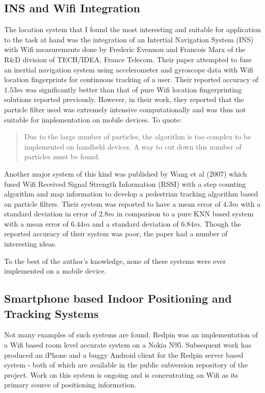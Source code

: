\subsection{INS and Wifi Integration}

The location system that I found the most interesting and suitable for application to the task at hand was the integration of an Intertial Navigation System (INS) with Wifi measurements done by Frederic Evennou and Francois Marx of the R\&D division of TECH/IDEA, France Telecom. Their paper \cite{Evennou} attempted to fuse an inertial navigation system using  accelerometer and gyroscope data with Wifi location fingerprints for continuous tracking of a user. Their reported accuracy of $1.53 m$ was significantly better than that of pure Wifi location fingerprinting solutions reported previously. However, in their work, they reported that the particle filter used was extremely intensive computationally and was thus not suitable for implementation on mobile devices. To quote:

\begin{quote}
Due to the large number of particles, the
algorithm is too complex to be implemented on handheld
devices. A way to cut down this number of particles must be
found.\cite{Evennou}
\end{quote}

Another major system of this kind was published by Wang et al (2007)\cite{Wang} which fused Wifi Received Signal Strength Information (RSSI) with a step counting algorithm and map information to develop a pedestrian tracking algorithm based on particle filters. Their system was reported to have a mean error of $4.3 m$ with a standard deviation in error of $2.8 m$ in comparison to a pure KNN based system with a mean error of $6.44 m$ and a standard deviation of $6.84 m$. Though the reported accuracy of their system was poor, the paper had a number of interesting ideas.

To the best of the author's knowledge, none of these systems were ever implemented on a mobile device.

\subsection{Smartphone based Indoor Positioning and Tracking Systems}

Not many examples of such systems are found. Redpin\cite{Redpin} was an implementation of a Wifi based room level accurate system on a Nokia N95. Subsequent work has produced an iPhone and a buggy Android client for the Redpin server based system - both of which are available in the public subversion repository of the project. Work on this system is ongoing and is concentrating on Wifi as its primary source of positioning information.

